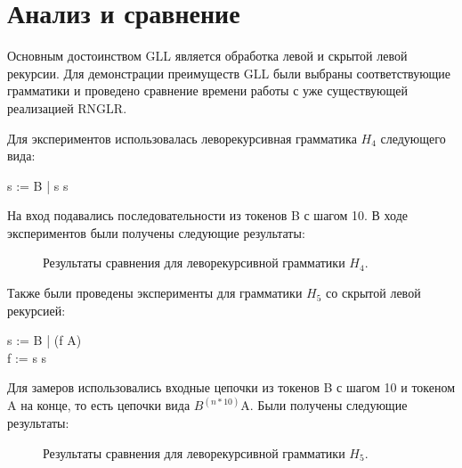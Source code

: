 \section{Анализ и сравнение}
Основным достоинством GLL является обработка левой и скрытой левой рекурсии. Для демонстрации преимуществ GLL были выбраны соответствующие грамматики и проведено сравнение времени работы с уже существующей реализацией RNGLR. 

Для экспериментов использовалась леворекурсивная грамматика $H_4$ следующего вида:
\begin{center}
    s := B | s s
\end{center}

На вход подавались последовательности из токенов B с шагом 10. В ходе экспериментов были получены следующие результаты:

\begin{figure}[h]
\caption{Результаты сравнения для леворекурсивной грамматики $H_4$.}
\label{fig11}
\end{figure}

Также были проведены эксперименты для грамматики $H_5$ со скрытой левой рекурсией:
\begin{center}
    s := B | (f A)
    \\f := s s
\end{center}
	
Для замеров использовались входные цепочки из токенов B с шагом 10 и токеном A на конце, то есть цепочки вида $B^(n*10)$A. Были получены следующие результаты:

\begin{figure}[h]
\caption{Результаты сравнения для леворекурсивной грамматики $H_5$.}
\label{fig12}
\end{figure}

